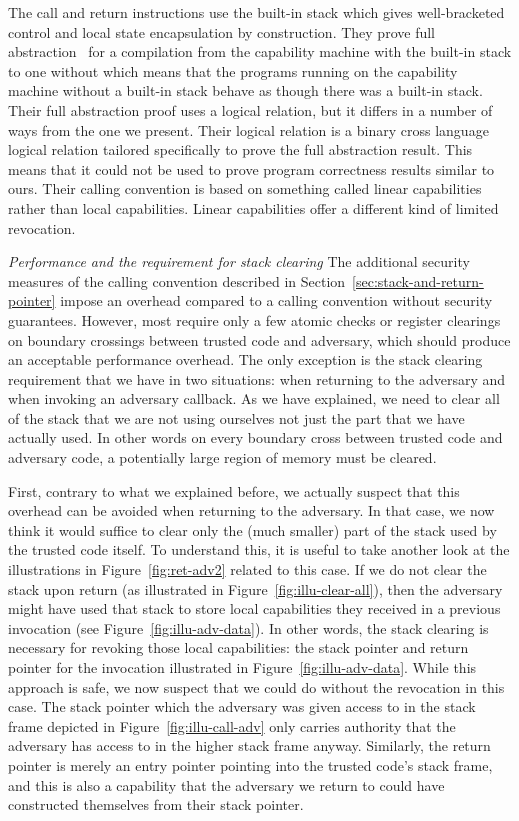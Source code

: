 \documentclass[format=acmsmall, review=true, screen=true]{acmart}
\renewcommand{\sectionname}{Section}
\newcommand{\itoplassug}[1]{}
\begin{document}
The call and return instructions use the built-in stack which gives well-bracketed control and local state encapsulation by construction.
They prove full abstraction~\citep{abadi_protection_1998} for a compilation from the capability machine with the built-in stack to one without which means that the programs running on the capability machine without a built-in stack behave as though there was a built-in stack.
Their full abstraction proof uses a logical relation, but it differs in a number of ways from the one we present.
Their logical relation is a binary cross language logical relation tailored specifically to prove the full abstraction result.
This means that it could not be used to prove program correctness results similar to ours.
Their calling convention is based on something called linear capabilities rather than local capabilities.
Linear capabilities offer a different kind of limited revocation.
\itoplassug{Maybe elaborate on why full-abstractness and not weaker properties like ``robust safety''.}

\emph{Performance and the requirement for stack clearing} The additional security measures of the calling convention described in \sectionname~\ref{sec:stack-and-return-pointer} impose an overhead compared to a calling convention without security guarantees.
However, most require only a few atomic checks or register clearings on boundary crossings between trusted code and adversary, which should produce an acceptable performance overhead.
The only exception is the stack clearing requirement that we have in two situations: when returning to the adversary and when invoking an adversary callback.
As we have explained, we need to clear all of the stack that we are not using ourselves not just the part that we have actually used.
In other words on every boundary cross between trusted code and adversary code, a potentially large region of memory must be cleared.

First, contrary to what we explained before, we actually suspect that this overhead can be avoided when returning to the adversary.
In that case, we now think it would suffice to clear only the (much smaller) part of the stack used by the trusted code itself.
To understand this, it is useful to take another look at the illustrations in Figure~\ref{fig:ret-adv2} related to this case.
If we do not clear the stack upon return (as illustrated in Figure~\ref{fig:illu-clear-all}), then the adversary might have used that stack to store local capabilities they received in a previous invocation (see Figure~\ref{fig:illu-adv-data}).
In other words, the stack clearing is necessary for revoking those local capabilities: the stack pointer and return pointer for the invocation illustrated in Figure~\ref{fig:illu-adv-data}.
While this approach is safe, we now suspect that we could do without the revocation in this case.
The stack pointer which the adversary was given access to in the stack frame depicted in Figure~\ref{fig:illu-call-adv} only carries authority that the adversary has access to in the higher stack frame anyway.
Similarly, the return pointer is merely an entry pointer pointing into the trusted code's stack frame, and this is also a capability that the adversary we return to could have constructed themselves from their stack pointer.
\end{document}
